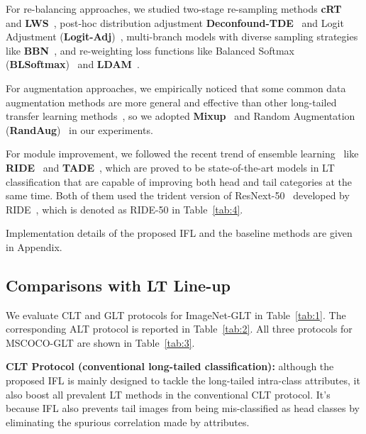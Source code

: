 \documentclass{article}
\begin{document}
For re-balancing approaches, we studied two-stage re-sampling methods \textbf{cRT}~\cite{kang2019decoupling} and \textbf{LWS}~\cite{kang2019decoupling}, post-hoc distribution adjustment \textbf{Deconfound-TDE}~\cite{tang2020long} and Logit Adjustment (\textbf{Logit-Adj})~\cite{menon2020long}, multi-branch models with diverse sampling strategies like \textbf{BBN}~\cite{zhou2019bbn}, and re-weighting loss functions like Balanced Softmax (\textbf{BLSoftmax})~\cite{ren2020balanced} and \textbf{LDAM}~\cite{cao2019ldam}.




For augmentation approaches, we empirically noticed that some common data augmentation methods are more general and effective than other long-tailed transfer learning methods~\cite{liu2020deep}, so we adopted \textbf{Mixup}~\cite{zhang2018mixup} and Random Augmentation (\textbf{RandAug})~\cite{cubuk2020randaugment} in our experiments.



For module improvement, we followed the recent trend of ensemble learning~\cite{wang2020long} like \textbf{RIDE}~\cite{wang2020long} and \textbf{TADE}~\cite{zhang2021test}, which are proved to be state-of-the-art models in LT classification that are capable of improving both head and tail categories at the same time. Both of them used the trident version of ResNext-50~\cite{xie2017aggregated} developed by RIDE~\cite{wang2020long}, which is denoted as RIDE-50 in Table~\ref{tab:4}.


Implementation details of the proposed IFL and the baseline methods are given in Appendix. 







\subsection{Comparisons with LT Line-up}



We evaluate CLT and GLT protocols for ImageNet-GLT in Table~\ref{tab:1}. The corresponding ALT protocol is reported in Table~\ref{tab:2}. All three protocols for MSCOCO-GLT are shown in Table~\ref{tab:3}.


\noindent\textbf{CLT Protocol (conventional long-tailed classification): } although the proposed IFL is mainly designed to tackle the long-tailed intra-class attributes, it also boost all prevalent LT methods in the conventional CLT protocol. It's because IFL also prevents tail images from being mis-classified as head classes by eliminating the spurious correlation made by attributes. 
\end{document}

